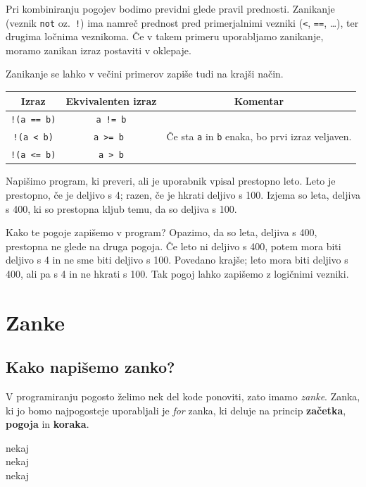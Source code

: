 \documentclass{book}
\begin{document}
Pri kombiniranju pogojev bodimo previdni glede pravil prednosti. Zanikanje
(veznik \verb+not+ oz.~\verb+!+) ima namreč prednost pred primerjalnimi
vezniki (\verb+<+, \verb+==+, \ldots), ter drugima ločnima veznikoma.
Če v takem primeru uporabljamo zanikanje, moramo zanikan izraz postaviti
v oklepaje.

\begin{examples}
  Zanikanje se lahko v večini primerov zapiše tudi na krajši način.

  \begin{tabular}{|c|c|c|}
	\hline
	Izraz & Ekvivalenten izraz & Komentar \\
	\hline
	\verb+!(a == b)+ & \verb+a != b+ & \\
	\verb+!(a < b)+ & \verb+a >= b + & Če sta \verb+a+ in \verb+b+ enaka, bo prvi izraz veljaven. \\
	\verb+!(a <= b)+ & \verb+a > b+ & \\
	\hline
  \end{tabular}
\end{examples}

\begin{examples}
Napišimo program, ki preveri, ali je uporabnik vpisal prestopno leto.
Leto je prestopno, če je deljivo s 4; razen, če je hkrati deljivo s 100. Izjema so leta, deljiva
s 400, ki so prestopna kljub temu, da so deljiva s 100.

Kako te pogoje zapišemo v program? Opazimo, da so leta, deljiva s 400,
prestopna ne glede na druga pogoja. Če leto ni deljivo s 400, potem mora biti
deljivo s 4 in ne sme biti deljivo s 100. Povedano krajše; leto mora biti
deljivo s 400, ali pa s 4 in ne hkrati s 100. Tak pogoj lahko zapišemo z
logičnimi vezniki.


\end{examples}

\chapter{Zanke}

\section{Kako napišemo zanko?}

V programiranju pogosto želimo nek del kode ponoviti, zato imamo \emph{zanke}.
Zanka, ki jo bomo najpogosteje uporabljali je \emph{for} zanka,
ki deluje na princip \textbf{začetka}, \textbf{pogoja} in \textbf{koraka}.
\begin{examples}

\begin{inout}
	nekaj \\
	nekaj \\
	nekaj
\end{inout}

\end{examples}
\end{document}

